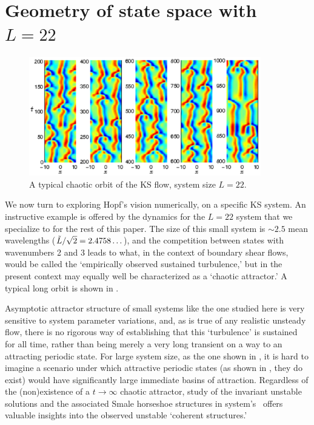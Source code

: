 
\section{Geometry of state space with $L=22$}
\label{sec:L22}

\begin{figure}[t]
\begin{center}
\includegraphics[width=0.9\textwidth, clip=true]{figs_bmp/ks_L22_long_orbit.eps}
\end{center}
\caption{
A typical chaotic orbit of the KS flow, system size $L=22$.
     } \label{f:ks_L22}
\end{figure}
We now turn to exploring Hopf's vision
numerically, on a specific KS system.
An instructive example is offered by the dynamics for
the  $L=22$  system that we specialize to for the rest of this paper.
The size of this small system is $\sim 2.5$ mean wavelengths
($\tilde{L}/\sqrt{2}= 2.4758\ldots$),
and the competition between states with wavenumbers 2 and 3
leads to what, in the context of boundary shear flows, would be
called the `empirically observed sustained
turbulence,' but in the present context may equally well be
characterized as a `chaotic attractor.' A typical long orbit
is shown in .

Asymptotic attractor structure of small systems like
the one studied here
is very sensitive to system parameter variations, and,
as is true of
any realistic unsteady flow, there is no rigorous way of
establishing that this `turbulence' is sustained for all time,
rather than being
merely a very long transient on a way to an
attracting periodic state.
For large system size, as the one shown in , it is
hard to imagine a scenario under which attractive periodic states
(as shown in , they do exist) would have significantly
large immediate basins of attraction.
Regardless of the
(non)existence of a $t \to \infty$ chaotic attractor, study
of the invariant unstable solutions and the associated Smale
horseshoe structures in system's \statesp\ offers valuable
insights into the observed unstable `coherent structures.'

